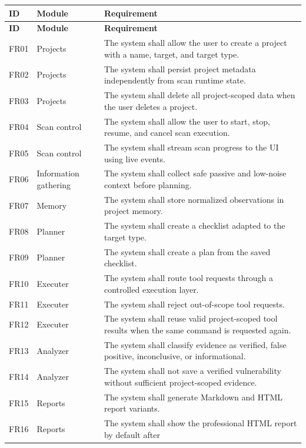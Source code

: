 \documentclass[12pt,a4paper]{report}
\begin{document}
\begin{longtable}{|p{}|p{}|p{}|}
\hline
\textbf{ID} & \textbf{Module} & \textbf{Requirement} \\
\hline
\endfirsthead
\hline
\textbf{ID} & \textbf{Module} & \textbf{Requirement} \\
\hline
\endhead
FR01 & Projects & The system shall allow the user to create a project with a name,
target, and target type. \\
\hline
FR02 & Projects & The system shall persist project metadata independently from scan
runtime state. \\
\hline
FR03 & Projects & The system shall delete all project-scoped data when the user deletes
a project. \\
\hline
FR04 & Scan control & The system shall allow the user to start, stop, resume, and cancel
scan execution. \\
\hline
FR05 & Scan control & The system shall stream scan progress to the UI using live events. \\
\hline
FR06 & Information gathering & The system shall collect safe passive and low-noise
context before planning. \\
\hline
FR07 & Memory & The system shall store normalized observations in project memory. \\
\hline
FR08 & Planner & The system shall create a checklist adapted to the target type. \\
\hline
FR09 & Planner & The system shall create a plan from the saved checklist. \\
\hline
FR10 & Executer & The system shall route tool requests through a controlled execution
layer. \\
\hline
FR11 & Executer & The system shall reject out-of-scope tool requests. \\
\hline
FR12 & Executer & The system shall reuse valid project-scoped tool results when the
same command is requested again. \\
\hline
FR13 & Analyzer & The system shall classify evidence as verified, false positive,
inconclusive, or informational. \\
\hline
FR14 & Analyzer & The system shall not save a verified vulnerability without sufficient
project-scoped evidence. \\
\hline
FR15 & Reports & The system shall generate Markdown and HTML report variants. \\
\hline
FR16 & Reports & The system shall show the professional HTML report by default after

\end{longtable}
\end{document}
